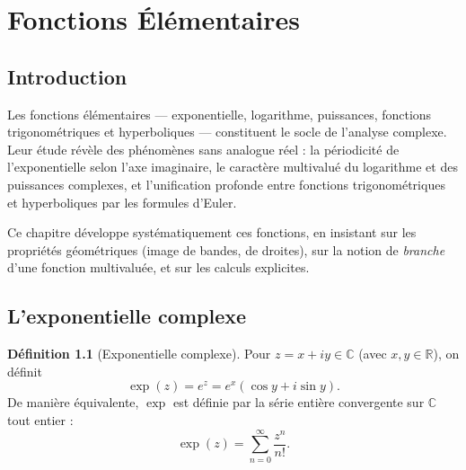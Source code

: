 \documentclass[12pt,a4paper,openany]{book}
\theoremstyle{definition}
\newtheorem{definition}{Définition}[chapter]
\theoremstyle{plain}
\theoremstyle{remark}
\newcommand{\C}{\mathbb{C}}
\newcommand{\R}{\mathbb{R}}
\begin{document}
\chapter{Fonctions Élémentaires}\label{chap:fonctions-elementaires}

\section{Introduction}

Les fonctions élémentaires --- exponentielle, logarithme, puissances, fonctions
trigonométriques et hyperboliques --- constituent le socle de l'analyse complexe.
Leur étude révèle des phénomènes sans analogue réel : la périodicité de
l'exponentielle selon l'axe imaginaire, le caractère multivalué du logarithme et
des puissances complexes, et l'unification profonde entre fonctions
trigonométriques et hyperboliques par les formules d'Euler.

Ce chapitre développe systématiquement ces fonctions, en insistant sur les
propriétés géométriques (image de bandes, de droites), sur la notion de
\emph{branche} d'une fonction multivaluée, et sur les calculs explicites.

\section{L'exponentielle complexe}\label{sec:exp}

\begin{definition}[Exponentielle complexe]\label{def:exp-complexe}
Pour $z = x + iy \in \C$ (avec $x, y \in \R$), on définit
\[
  \exp(z) = e^z = e^x(\cos y + i \sin y).
\]
De manière équivalente, $\exp$ est définie par la série entière convergente sur $\C$ tout entier :
\[
  \exp(z) = \sum_{n=0}^{\infty} \frac{z^n}{n!}.
\]
\end{definition}
\end{document}
